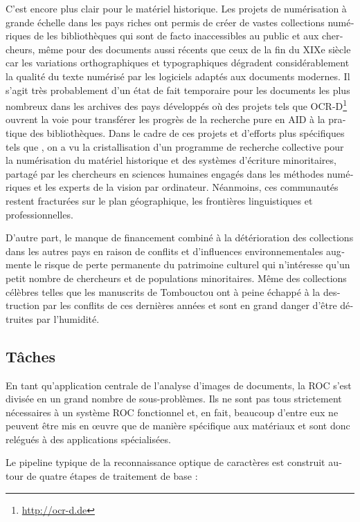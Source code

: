 \begin{french}
C'est encore plus clair pour le matériel historique. Les projets de
numérisation à grande échelle dans les pays riches ont permis de créer de
vastes collections numériques de les bibliothèques qui sont de facto
inaccessibles au public et aux chercheurs, même pour des documents aussi
récents que ceux de la fin du XIXe siècle car les variations orthographiques et
typographiques dégradent considérablement la qualité du texte numérisé par les
logiciels adaptés aux documents modernes. Il s'agit très probablement d'un état
de fait temporaire pour les documents les plus nombreux dans les archives des
pays développés où des projets tels que OCR-D\footnote{\url{http://ocr-d.de}}
ouvrent la voie pour transférer les progrès de la recherche pure en AID à la
pratique des bibliothèques. Dans le cadre de ces projets et d'efforts plus
spécifiques tels que \cite{smith2018research}, on a vu la cristallisation d'un
programme de recherche collective pour la numérisation du matériel historique
et des systèmes d'écriture minoritaires, partagé par les chercheurs en sciences
humaines engagés dans les méthodes numériques et les experts de la vision par
ordinateur. Néanmoins, ces communautés restent fracturées sur le plan
géographique, les frontières linguistiques et professionnelles.

D'autre part, le manque de financement combiné à la détérioration des
collections dans les autres pays en raison de conflits et d'influences
environnementales augmente le risque de perte permanente du patrimoine culturel
qui n'intéresse qu'un petit nombre de chercheurs et de populations
minoritaires. Même des collections célèbres telles que les manuscrits de
Tombouctou ont à peine échappé à la destruction par les conflits de ces
dernières années et sont en grand danger d'être détruites par l'humidité. 

\subsection{Tâches}

En tant qu'application centrale de l'analyse d'images de documents, la ROC
s'est divisée en un grand nombre de sous-problèmes. Ils ne sont pas tous
strictement nécessaires à un système ROC fonctionnel et, en fait, beaucoup
d'entre eux ne peuvent être mis en œuvre que de manière spécifique aux
matériaux et sont donc relégués à des applications spécialisées.

Le pipeline typique de la reconnaissance optique de caractères est construit
autour de quatre étapes de traitement de base :


\end{french}
